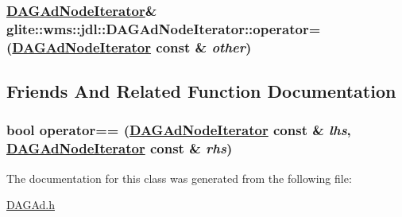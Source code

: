 \hypertarget{classglite_1_1wms_1_1jdl_1_1DAGAdNodeIterator_a4}{
\subsubsection[operator=]{\setlength{\rightskip}{0pt plus 5cm}\hyperlink{classglite_1_1wms_1_1jdl_1_1DAGAdNodeIterator}{DAGAd\-Node\-Iterator}\& glite::wms::jdl::DAGAd\-Node\-Iterator::operator= (\hyperlink{classglite_1_1wms_1_1jdl_1_1DAGAdNodeIterator}{DAGAd\-Node\-Iterator} const \& {\em other})}}
\label{classglite_1_1wms_1_1jdl_1_1DAGAdNodeIterator_a4}




\subsection{Friends And Related Function Documentation}
\hypertarget{classglite_1_1wms_1_1jdl_1_1DAGAdNodeIterator_n0}{
\subsubsection[operator==]{\setlength{\rightskip}{0pt plus 5cm}bool operator== (\hyperlink{classglite_1_1wms_1_1jdl_1_1DAGAdNodeIterator}{DAGAd\-Node\-Iterator} const \& {\em lhs}, \hyperlink{classglite_1_1wms_1_1jdl_1_1DAGAdNodeIterator}{DAGAd\-Node\-Iterator} const \& {\em rhs})}}
\label{classglite_1_1wms_1_1jdl_1_1DAGAdNodeIterator_n0}




The documentation for this class was generated from the following file:\begin{CompactItemize}
\item 
\hyperlink{DAGAd_8h}{DAGAd.h}\end{CompactItemize}

